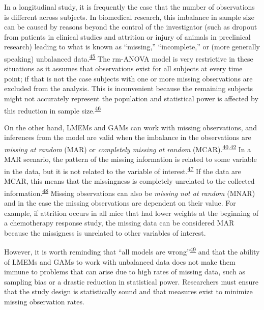 \documentclass[
]{article}
\begin{document}
In a longitudinal study, it is frequently the case that the number of observations is different across subjects. In biomedical research, this imbalance in sample size can be caused by reasons beyond the control of the investigator (such as dropout from patients in clinical studies and attrition or injury of animals in preclinical research) leading to what is known as ``missing,'' ``incomplete,'' or (more generally speaking) unbalanced data.\textsuperscript{\protect\hyperlink{ref-molenberghs2004}{45}} The rm-ANOVA model is very restrictive in these situations as it assumes that observations exist for all subjects at every time point; if that is not the case subjects with one or more missing observations are excluded from the analysis. This is inconvenient because the remaining subjects might not accurately represent the population and statistical power is affected by this reduction in sample size.\textsuperscript{\protect\hyperlink{ref-ma2012}{46}}

On the other hand, LMEMs and GAMs can work with missing observations, and inferences from the model are valid when the imbalance in the observations are \emph{missing at random} (MAR) or \emph{completely missing at random} (MCAR).\textsuperscript{\protect\hyperlink{ref-west2014}{40},\protect\hyperlink{ref-weiss2005}{42}} In a MAR scenario, the pattern of the missing information is related to some variable in the data, but it is not related to the variable of interest.\textsuperscript{\protect\hyperlink{ref-scheffer2002}{47}} If the data are MCAR, this means that the missingness is completely unrelated to the collected information.\textsuperscript{\protect\hyperlink{ref-potthoff2006}{48}} Missing observations can also be \emph{missing not at random} (MNAR) and in the case the missing observations are dependent on their value. For example, if attrition occurs in all mice that had lower weights at the beginning of a chemotherapy response study, the missing data can be considered MAR because the missigness is unrelated to other variables of interest.

However, it is worth reminding that ``all models are wrong''\textsuperscript{\protect\hyperlink{ref-box1976}{49}} and that the ability of LMEMs and GAMs to work with unbalanced data does not make them immune to problems that can arise due to high rates of missing data, such as sampling bias or a drastic reduction in statistical power. Researchers must ensure that the study design is statistically sound and that measures exist to minimize missing observation rates.
\end{document}
